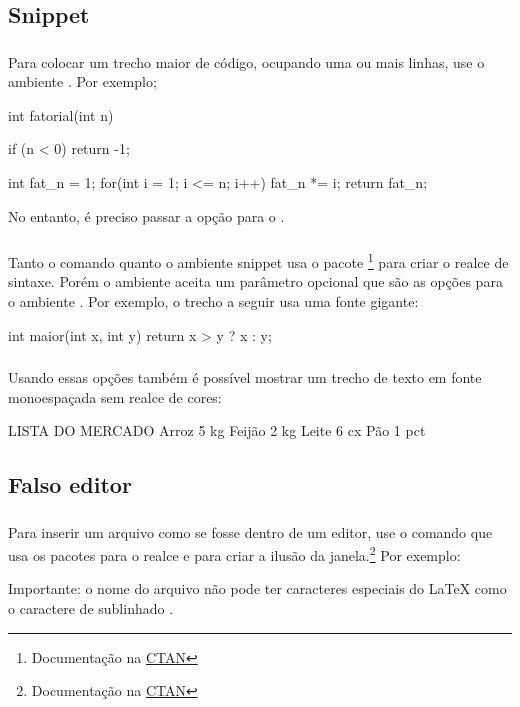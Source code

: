 \documentclass[aspectratio=169]{beamer}
\begin{document}
\subsection{Snippet}

\begin{frame}[t,fragile]\frametitle{\secname}\framesubtitle{\subsecname}
  Para colocar um trecho maior de código, ocupando uma ou mais linhas, use o ambiente . Por exemplo;

  \begin{snippet}
int fatorial(int n) {
  if (n < 0) return -1;

  int fat_n = 1;
  for(int i = 1; i <= n; i++) {
    fat_n *= i;
  }
  return fat_n;
}
  \end{snippet}
No entanto, é preciso passar a opção  para o .
\end{frame}

\begin{frame}[t,fragile]\frametitle{\secname}\framesubtitle{\subsecname}
  Tanto o comando  quanto o ambiente snippet usa o pacote \footnote[frame]{Documentação na \href{http://mirrors.ctan.org/macros/latex/contrib/listings/listings.pdf}{CTAN}} para criar o realce de sintaxe.
  Porém o ambiente  aceita um parâmetro opcional que são as opções para o ambiente .
  Por exemplo, o trecho a seguir usa uma fonte gigante:

\begin{snippet}[basicstyle=\Huge\ttfamily\color{codefg}]
int maior(int x, int y) {
  return x > y ? x : y;
}
\end{snippet}
\end{frame}

\begin{frame}[t,fragile]\frametitle{\secname}\framesubtitle{\subsecname}
  Usando essas opções também é possível mostrar um trecho de texto em fonte monoespaçada sem realce de cores:
\begin{snippet}[style=text]
LISTA DO MERCADO
Arroz       5 kg
Feijão      2 kg
Leite       6 cx
Pão         1 pct
\end{snippet}
\end{frame}

\subsection{Falso editor}

\begin{frame}[t]\frametitle{\secname}\framesubtitle{\subsecname}
  Para inserir um arquivo como se fosse dentro de um editor, use o comando  que usa os pacotes  para o realce e  para criar a ilusão da janela.\footnote[frame]{Documentação na \href{http://mirrors.ctan.org/macros/latex/contrib/tcolorbox/tcolorbox.pdf}{CTAN}} Por exemplo:

  Importante: o nome do arquivo não pode ter caracteres especiais do \LaTeX{}  como o caractere de sublinhado \inline*{\_}.
\end{frame}
\end{document}
